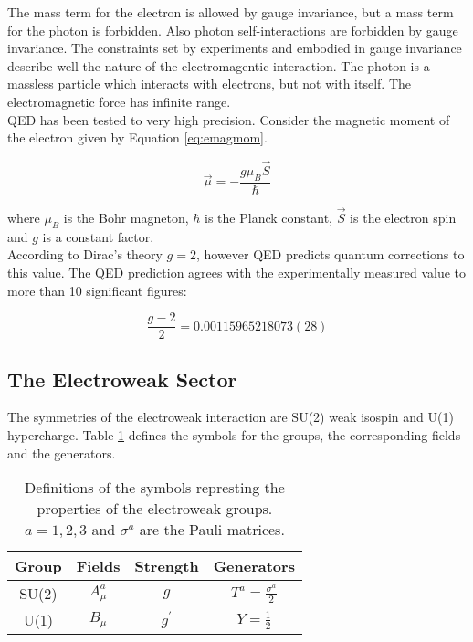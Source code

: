 The mass term for the electron is allowed by gauge invariance, but a mass term for 
the photon is forbidden. Also photon self-interactions are forbidden by gauge 
invariance. The constraints set by experiments and embodied in gauge invariance 
describe well the nature of the electromagentic interaction. The photon is 
a massless particle which interacts with electrons, but not with itself. The 
electromagnetic force has infinite range. \\

QED has been tested to very high precision. Consider the magnetic moment of the
electron given by Equation \ref{eq:emagmom}.

\begin{equation}
\vec{\mu} = -\frac{g\mu_{B}\vec{S}}{\hbar}
\label{eq:emagmom}
\end{equation}

where $\mu_B$ is the Bohr magneton, $\hbar$ is the Planck constant, $\vec{S}$ is
the electron spin and $g$ is a constant factor. \\

According to Dirac's theory $g = 2$, however QED predicts quantum corrections to
this value. The QED prediction agrees with the experimentally measured value 
\cite{qed} to more than 10 significant figures:

\begin{equation}
\frac{g - 2}{2} = 0.00115965218073(28)
\end{equation}

\subsection{The Electroweak Sector}

The symmetries of the electroweak interaction are SU(2) weak isospin and U(1) 
hypercharge. Table \ref{tab:ewk} defines the symbols for the groups, the 
corresponding fields and the generators. \\

\begin{table}
\begin{center}
\begin{tabular}{|c|c|c|c|}
\hline
Group & Fields & Strength & Generators \\
\hline
SU(2) & $A_{\mu}^{a}$ & $g$ & $T^{a} = \frac{\sigma^{a}}{2}$ \\
U(1) & $B_{\mu}$ & $g^{\prime}$ & $Y = \frac{1}{2}$ \\
\hline
\end{tabular}
\end{center}
\caption{Definitions of the symbols represting the properties of the electroweak
groups. $a = 1, 2, 3$ and $\sigma^{a}$ are the Pauli matrices.}
\label{tab:ewk}
\end{table}

